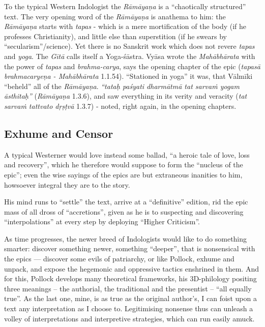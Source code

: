 To the typical Western Indologist the {\sl Rāmāyaṇa} is a ``chaotically structured'' text. The very opening word of the {\sl Rāmāyaṇa} is anathema to him: the {\sl Rāmāyaṇa} starts with {\sl tapas} -  which is a mere mortification of the body (if he professes Christianity), and little else than superstition (if he swears by ``secularism''/science). Yet there is no Sanskrit work which does not revere {\sl tapas} and {\sl yoga}. The {\sl Gītā} calls itself a Yoga-śāstra. Vyāsa wrote the {\sl Mahābhārata} with the power of {\sl tapas} and {\sl brahma-carya}, says the opening chapter of the epic ({\sl tapasā brahmacaryeṇa  - Mahābhārata} 1.1.54). ``Stationed in yoga'' it was, that Vālmīki  ``beheld'' all of the {\sl Rāmāyaṇa}. {\sl ``tataḥ paśyati dharmātmā tat sarvaṁ yogam āsthitaḥ''} ({\sl Rāmāyaṇa} 1.3.6), and saw everything in its verity and veracity ({\sl tat sarvaṁ tattvato dṛṣṭvā} 1.3.7) - noted, right again, in the opening chapters.\\[-18pt]

\subsection*{Exhume and Censor}

A typical Westerner would love instead some ballad, ``a heroic tale of love, loss and recovery'', which he therefore would suppose to form the ``nucleus of the epic''; even the wise sayings of the epics are but extraneous inanities to him, howsoever integral they are to the story.

His mind runs to “settle” the text, arrive at a “definitive” edition, rid the epic mass of all dross of  “accretions”, given as he is to suspecting and discovering “interpolations” at every step by deploying “Higher Criticism”.

As time progresses, the newer breed of Indologists would like to do something smarter: discover something newer, something “deeper”, that is nonsensical with the epics --- discover some evils of patriarchy, or like Pollock, exhume and unpack, and expose the hegemonic and oppressive tactics enshrined in them. And for this, Pollock develops many theoretical frameworks, his 3D-philology positing three meanings -- the authorial, the traditional and the presentist -- “all equally true”. As the last one, mine, is as true as the original author's, I can foist upon a text any interpretation as I choose to. Legitimising nonsense thus can unleash a volley of interpretations and interpretive strategies, which can run easily amuck.

